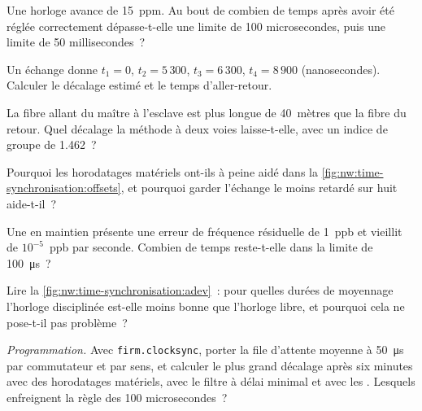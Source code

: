 \begin{exercise}[$\star$]\label{exo:nw:time-synchronisation:1}
Une horloge avance de 15~ppm. Au bout de combien de temps après avoir été réglée correctement dépasse-t-elle une limite de 100 microsecondes, puis une limite de 50 millisecondes~?
\end{exercise}

\begin{exercise}[$\star$]\label{exo:nw:time-synchronisation:2}
Un échange donne $t_1 = 0$, $t_2 = 5\,300$, $t_3 = 6\,300$, $t_4 = 8\,900$ (nanosecondes). Calculer le décalage estimé
et le temps d'aller-retour.
\end{exercise}

\begin{exercise}[$\star$]\label{exo:nw:time-synchronisation:3}
La fibre allant du maître à l'esclave est plus longue de 40~mètres que la fibre du retour. Quel décalage la méthode à deux voies laisse-t-elle, avec un indice
de groupe de 1.462~?
\end{exercise}

\begin{exercise}[$\star\star$]\label{exo:nw:time-synchronisation:4}
Pourquoi les horodatages matériels ont-ils à peine aidé dans la \cref{fig:nw:time-synchronisation:offsets}, et pourquoi garder l'échange le moins retardé
sur huit aide-t-il~?
\end{exercise}

\begin{exercise}[$\star\star$]\label{exo:nw:time-synchronisation:5}
Une  en maintien présente une erreur de fréquence résiduelle de 1~ppb et vieillit de $10^{-5}$~ppb par seconde. Combien de temps reste-t-elle
dans la limite de \qty{100}{\micro\second}~?
\end{exercise}

\begin{exercise}[$\star\star$]\label{exo:nw:time-synchronisation:6}
Lire la \cref{fig:nw:time-synchronisation:adev}~: pour quelles durées de moyennage l'horloge disciplinée est-elle moins bonne que l'horloge libre, et pourquoi
cela ne pose-t-il pas problème~?
\end{exercise}

\begin{exercise}[$\star\star\star$]\label{exo:nw:time-synchronisation:7}
\emph{Programmation.} Avec \texttt{firm.clocksync}, porter la file d'attente moyenne à \qty{50}{\micro\second} par commutateur et par sens, et calculer le
plus grand décalage après six minutes avec des horodatages matériels, avec le filtre à délai minimal et avec les . Lesquels
enfreignent la règle des 100 microsecondes~?
\end{exercise}

